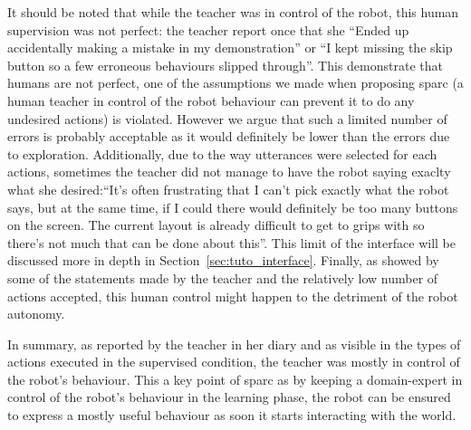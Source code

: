 It should be noted that while the teacher was in control of the robot, this human supervision was not perfect: the teacher report once that she	``Ended up accidentally making a mistake in my demonstration'' or ``I kept missing the skip button so a few erroneous behaviours slipped through''. This demonstrate that humans are not perfect, one of the assumptions we made when proposing \gls{sparc} (a human teacher in control of the robot behaviour can prevent it to do any undesired actions) is violated. However we argue that such a limited number of errors is probably acceptable as it would definitely be lower than the errors due to exploration. Additionally, due to the way utterances were selected for each actions, sometimes the teacher did not manage to have the robot saying exaclty what she desired:``It’s often frustrating that I can’t pick exactly what the robot says, but at the same time, if I could there would definitely be too many buttons on the screen. The current layout is already difficult to get to grips with so there’s not much that can be done about this''. This limit of the interface will be discussed more in depth in Section~\ref{sec:tuto_interface}. Finally, as showed by some of the statements made by the teacher and the relatively low number of actions accepted, this human control might happen to the detriment of the robot autonomy.

In summary, as reported by the teacher in her diary and as visible in the types of actions executed in the supervised condition, the teacher was mostly in control of the robot's behaviour. This a key point of \gls{sparc} as by keeping a domain-expert in control of the robot's behaviour in the learning phase, the robot can be ensured to express a mostly useful behaviour as soon it starts interacting with the world. 

